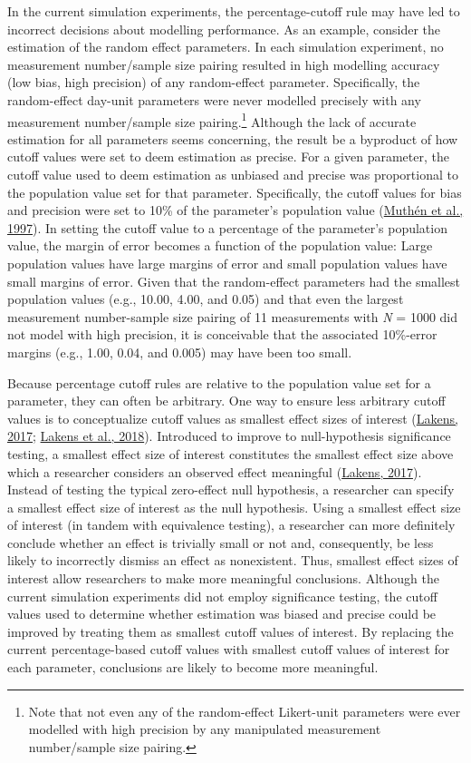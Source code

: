 \documentclass[
12pt, %
twoside,
english]{guelphthesis}
\begin{document}
In the current simulation experiments, the percentage-cutoff rule may have led to incorrect decisions about modelling performance. As an example, consider the estimation of the random effect parameters. In each simulation experiment, no measurement number/sample size pairing resulted in high modelling accuracy (low bias, high precision) of any random-effect parameter. Specifically, the random-effect day-unit parameters were never modelled precisely with any measurement number/sample size pairing.\footnote{Note that not even any of the random-effect Likert-unit parameters were ever modelled with high precision by any manipulated measurement number/sample size pairing.} Although the lack of accurate estimation for all parameters seems concerning, the result be a byproduct of how cutoff values were set to deem estimation as precise. For a given parameter, the cutoff value used to deem estimation as unbiased and precise was proportional to the population value set for that parameter. Specifically, the cutoff values for bias and precision were set to 10\% of the parameter's population value (\protect\hyperlink{ref-muthen1997}{Muthén et al., 1997}). In setting the cutoff value to a percentage of the parameter's population value, the margin of error becomes a function of the population value: Large population values have large margins of error and small population values have small margins of error. Given that the random-effect parameters had the smallest population values (e.g., 10.00, 4.00, and 0.05) and that even the largest measurement number-sample size pairing of 11 measurements with \emph{N} = 1000 did not model with high precision, it is conceivable that the associated 10\%-error margins (e.g., 1.00, 0.04, and 0.005) may have been too small.

Because percentage cutoff rules are relative to the population value set for a parameter, they can often be arbitrary. One way to ensure less arbitrary cutoff values is to conceptualize cutoff values as smallest effect sizes of interest (\protect\hyperlink{ref-lakens2017}{Lakens, 2017}; \protect\hyperlink{ref-lakens2018}{Lakens et al., 2018}). Introduced to improve to null-hypothesis significance testing, a smallest effect size of interest constitutes the smallest effect size above which a researcher considers an observed effect meaningful (\protect\hyperlink{ref-lakens2017}{Lakens, 2017}). Instead of testing the typical zero-effect null hypothesis, a researcher can specify a smallest effect size of interest as the null hypothesis. Using a smallest effect size of interest (in tandem with equivalence testing), a researcher can more definitely conclude whether an effect is trivially small or not and, consequently, be less likely to incorrectly dismiss an effect as nonexistent. Thus, smallest effect sizes of interest allow researchers to make more meaningful conclusions. Although the current simulation experiments did not employ significance testing, the cutoff values used to determine whether estimation was biased and precise could be improved by treating them as smallest cutoff values of interest. By replacing the current percentage-based cutoff values with smallest cutoff values of interest for each parameter, conclusions are likely to become more meaningful.
\end{document}
